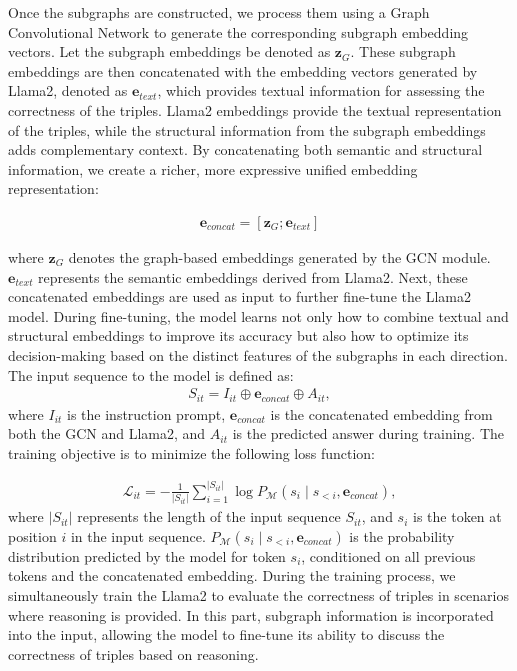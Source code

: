 Once the subgraphs are constructed, we process them using a Graph Convolutional Network to generate the corresponding subgraph embedding vectors. Let the subgraph embeddings be denoted as \( \mathbf{z}_{G} \). These subgraph embeddings are then concatenated with the embedding vectors generated by Llama2, denoted as \( \mathbf{e}_{text} \), which provides textual information for assessing the correctness of the triples. Llama2 embeddings provide the textual representation of the triples, while the structural information from the subgraph embeddings adds complementary context. By concatenating both semantic and structural information, we create a richer, more expressive unified embedding representation:

\begin{align}
    \mathbf{e}_{concat} = [\mathbf{z}_{G} ; \mathbf{e}_{text}]
\end{align}

where \(\mathbf{z}_{G}\) denotes the graph-based embeddings generated by the GCN module. \(\mathbf{e}_{text}\) represents the semantic embeddings derived from Llama2.
Next, these concatenated embeddings are used as input to further fine-tune the Llama2 model. During fine-tuning, the model learns not only how to combine textual and structural embeddings to improve its accuracy but also how to optimize its decision-making based on the distinct features of the subgraphs in each direction. The input sequence to the model is defined as:
% 
\begin{align}
    S_{it} = I_{it} \oplus \mathbf{e}_{concat} \oplus A_{it},
\end{align}
% 
where \( I_{it} \) is the instruction prompt, \( \mathbf{e}_{concat} \) is the concatenated embedding from both the GCN and Llama2, and \( A_{it} \) is the predicted answer during training. 
The training objective is to minimize the following loss function:

\begin{align}
    \mathcal{L}_{it} = - \frac{1}{|S_{it}|} \sum_{i=1}^{|S_{it}|} \log P_{\mathcal{M}}(s_i \mid s_{<i}, \mathbf{e}_{concat}), 
\end{align}
% 
where \( |S_{it}| \) represents the length of the input sequence \( S_{it} \), and \( s_i \) is the token at position \( i \) in the input sequence. \( P_{\mathcal{M}}(s_i \mid s_{<i}, \mathbf{e}_{concat}) \) is the probability distribution predicted by the model for token \( s_i \), conditioned on all previous tokens and the concatenated embedding.
% 
During the training process, we simultaneously train the Llama2 to evaluate the correctness of triples in scenarios where reasoning is provided. In this part, subgraph information is incorporated into the input, allowing the model to fine-tune its ability to discuss the correctness of triples based on reasoning.

